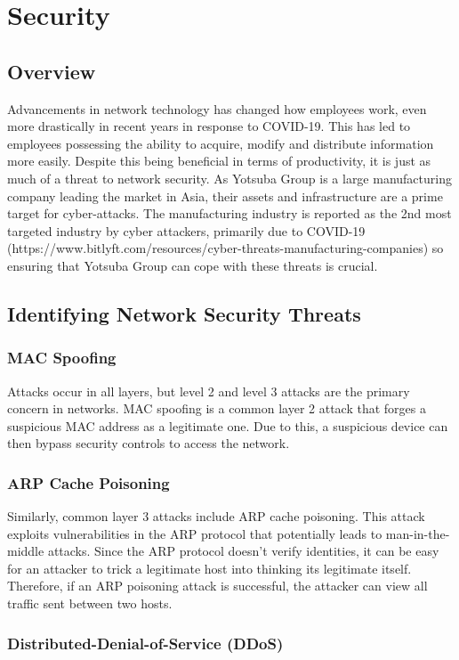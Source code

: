 \chapter{Security}

\section{Overview}
Advancements in network technology has changed how employees work, even more drastically in recent years in response to COVID-19. This has led to employees possessing the ability to acquire, modify and distribute information more easily. Despite this being beneficial in terms of productivity, it is just as much of a threat to network security.
As Yotsuba Group is a large manufacturing company leading the market in Asia, their assets and infrastructure are a prime target for cyber-attacks. The manufacturing industry is reported as the 2nd most targeted industry by cyber attackers, primarily due to COVID-19 (https://www.bitlyft.com/resources/cyber-threats-manufacturing-companies) so ensuring that Yotsuba Group can cope with these threats is crucial.
\section{Identifying Network Security Threats}
\subsection{MAC Spoofing}
Attacks occur in all layers, but level 2 and level 3 attacks are the primary concern in networks. MAC spoofing is a common layer 2 attack that forges a suspicious MAC address as a legitimate one. Due to this, a suspicious device can then bypass security controls to access the network. 
\subsection{ARP Cache Poisoning}
Similarly, common layer 3 attacks include ARP cache poisoning. This attack exploits vulnerabilities in the ARP protocol that potentially leads to man-in-the-middle attacks. Since the ARP protocol doesn’t verify identities, it can be easy for an attacker to trick a legitimate host into thinking its legitimate itself. Therefore, if an ARP poisoning attack is successful, the attacker can view all traffic sent between two hosts.
\subsection{Distributed-Denial-of-Service (DDoS)}

